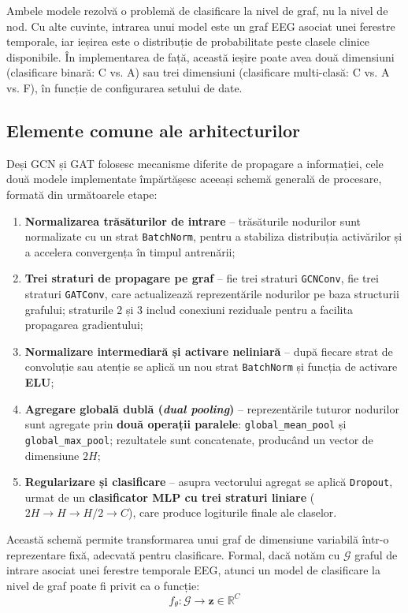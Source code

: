\documentclass[12pt,a4paper]{report}
\theoremstyle{definition}
\theoremstyle{remark}
\begin{document}
Ambele modele rezolvă o problemă de clasificare la nivel de graf, nu la nivel de nod. Cu alte cuvinte, intrarea unui model este un graf EEG asociat unei ferestre temporale, iar ieșirea este o distribuție de probabilitate peste clasele clinice disponibile. În implementarea de față, această ieșire poate avea două dimensiuni (clasificare binară: C vs. A) sau trei dimensiuni (clasificare multi-clasă: C vs. A vs. F), în funcție de configurarea setului de date.

\subsection{Elemente comune ale arhitecturilor}

Deși GCN și GAT folosesc mecanisme diferite de propagare a informației, cele două modele implementate împărtășesc aceeași schemă generală de procesare, formată din următoarele etape:

\begin{enumerate}
    \item \textbf{Normalizarea trăsăturilor de intrare} -- trăsăturile nodurilor sunt normalizate cu un strat \texttt{BatchNorm}, pentru a stabiliza distribuția activărilor și a accelera convergența în timpul antrenării;
    \item \textbf{Trei straturi de propagare pe graf} -- fie trei straturi \texttt{GCNConv}, fie trei straturi \texttt{GATConv}, care actualizează reprezentările nodurilor pe baza structurii grafului; straturile 2 și 3 includ conexiuni reziduale pentru a facilita propagarea gradientului;
    \item \textbf{Normalizare intermediară și activare neliniară} -- după fiecare strat de convoluție sau atenție se aplică un nou strat \texttt{BatchNorm} și funcția de activare \textbf{ELU};
    \item \textbf{Agregare globală dublă (\textit{dual pooling})} -- reprezentările tuturor nodurilor sunt agregate prin \textbf{două operații paralele}: \texttt{global\_mean\_pool} și \texttt{global\_max\_pool}; rezultatele sunt concatenate, producând un vector de dimensiune $2H$;
    \item \textbf{Regularizare și clasificare} -- asupra vectorului agregat se aplică \texttt{Dropout}, urmat de un \textbf{clasificator MLP cu trei straturi liniare} ($2H \to H \to H/2 \to C$), care produce logiturile finale ale claselor.
\end{enumerate}

Această schemă permite transformarea unui graf de dimensiune variabilă într-o reprezentare fixă, adecvată pentru clasificare. Formal, dacă notăm cu $\mathcal{G}$ graful de intrare asociat unei ferestre temporale EEG, atunci un model de clasificare la nivel de graf poate fi privit ca o funcție:
\begin{equation}
    f_{\theta} : \mathcal{G} \rightarrow \mathbf{z} \in \mathbb{R}^{C}
    \label{eq:graph_classifier}
\end{equation}
\end{document}
